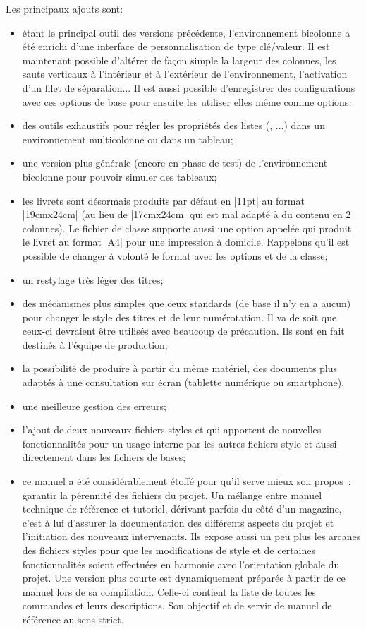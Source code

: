 \documentclass[other,11pt,fonts,openany]{cpgelvrt}
\let\ENV\env
\renewcommand\env[1]{{\spotcolor\ENV{#1}}}
\let\OPT\opt
\renewcommand\opt[1]{{\spotcolor\OPT{#1}}}
\let\FILE\file
\renewcommand\file[1]{{\color{fs}\FILE{#1}}}
\begin{document}
Les principaux ajouts sont: 
\begin{itemize}
     \item étant le principal outil des versions précédente, l'environnement bicolonne a été enrichi d'une interface de personnalisation  de type clé/valeur. Il est maintenant possible d'altérer de façon simple la largeur des colonnes, les sauts verticaux à l'intérieur et à l'extérieur de l'environnement, l'activation d'un filet de séparation... Il est aussi possible d'enregistrer des configurations avec ces options de base pour ensuite les utiliser elles même comme options.
     \item des outils exhaustifs pour régler les propriétés des listes (, ...) dans un environnement multicolonne ou dans un tableau;  
     \item une version plus générale (encore en phase de test) de l'environnement bicolonne pour pouvoir simuler des tableaux; 
     \item les livrets sont désormais produits par défaut en |11pt| au format |19cmx24cm| (au lieu de |17cmx24cm| qui est mal adapté à du contenu en 2 colonnes). Le fichier de classe supporte aussi une option appelée  qui produit le livret au format |A4| pour une impression à domicile. Rappelons qu'il est possible de changer à volonté le format avec les options  et  de la classe;
     \item  un restylage très léger des titres; 
     \item des mécanismes plus simples que ceux standards (de base il n'y en a aucun) pour changer le style des titres et de leur numérotation. Il va de soit que ceux-ci devraient être utilisés avec beaucoup de précaution. Ils sont en fait destinés à l'équipe de production; 
     \item la possibilité de produire à partir du même matériel, des documents plus adaptés à une consultation sur écran (tablette numérique ou smartphone).
     \item une meilleure gestion des erreurs; 
     \item l'ajout de deux nouveaux fichiers styles  et  qui apportent de nouvelles fonctionnalités pour un usage interne par les autres fichiers style et aussi directement dans les fichiers de bases; 
     \item ce manuel a été considérablement étoffé pour qu'il serve mieux son propos~: garantir la pérennité des fichiers du projet. Un mélange entre manuel technique de référence et tutoriel, dérivant parfois du côté d'un magazine, c'est à lui d'assurer la documentation des différents aspects du projet et l'initiation des nouveaux intervenants. Ils expose aussi un peu plus les arcanes des fichiers styles pour que les modifications de style et de certaines fonctionnalités soient effectuées en harmonie avec l'orientation globale du projet. Une version plus courte est dynamiquement préparée à partir de ce manuel lors de sa compilation. Celle-ci contient la liste de toutes les commandes et leurs descriptions. Son objectif et de servir de manuel de référence au sens strict.
\end{itemize} 
\end{document}
